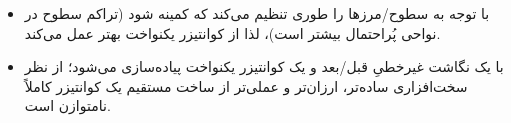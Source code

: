 \begin{itemize}
    \item[(الف)]  با توجه به  سطوح/مرزها را طوری تنظیم می‌کند که  کمینه شود (تراکم سطوح در نواحی پُراحتمال بیشتر است)، لذا از کوانتیزر یکنواخت بهتر عمل می‌کند.
    \item[(ب)]  با یک نگاشت غیرخطیِ قبل/بعد و یک کوانتیزر یکنواخت پیاده‌سازی می‌شود؛ از نظر سخت‌افزاری ساده‌تر، ارزان‌تر و عملی‌تر از ساخت مستقیم یک کوانتیزر کاملاً نامتوازن است.
\end{itemize}
